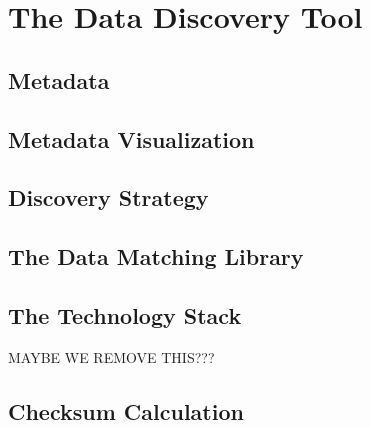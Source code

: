 \chapter{The Data Discovery Tool}\label{ch:ch2label}


\section{Metadata}


\section{Metadata Visualization}



\section{Discovery Strategy}



\section{The Data Matching Library}



\section{The Technology Stack}
MAYBE WE REMOVE THIS???


\section{Checksum Calculation}



